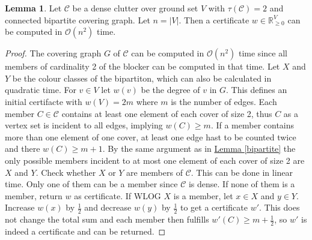 \documentclass[a4paper, 12pt]{scrbook}
\theoremstyle{definition}
\newtheorem{lemma}[theorem]{Lemma}
\newcommand*{\IR}{\ensuremath{\mathbb{R}}}
\begin{document}
   \begin{lemma}\label{computecert}
       Let $\mathcal{C}$ be a dense clutter over ground set $V$ with $\tau(\mathcal{C})=2$ and connected bipartite covering graph. Let $n=|V|$. Then a certificate $w \in \IR^V_{\geq 0}$ can be computed in $\mathcal{O}(n^2)$ time.
   \end{lemma}

   \begin{proof}
       The covering graph $G$ of $\mathcal{C}$ can be computed in $\mathcal{O}(n^2)$ time since all members of cardinality 2 of the blocker can be computed in that time.
       Let $X$ and $Y$ be the colour classes of the bipartiton, which can also be calculated in quadratic time.
       For $v \in V$ let $w(v)$ be the degree of $v$ in $G$. This defines an initial certifacte with $w(V) = 2m$ where $m$ is the number of edges.
       Each member $C \in \mathcal{C}$ contains at least one element of each cover of size 2, thus $C$ as a vertex set is incident to all edges, implying $w(C) \geq m$.
       If a member contains more than one element of one cover, at least one edge hast to be counted twice and there $w(C) \geq m+1$.
       By the same argument as in \hyperref[bipartite]{Lemma \ref*{bipartite}} the only possible members incident to at most one element of each cover of size 2 are $X$ and $Y$.
       Check whether $X$ or $Y$ are members of $\mathcal{C}$. This can be done in linear time.
       Only one of them can be a member since $\mathcal{C}$ is dense.
       If none of them is a member, return $w$ as certificate.
       If WLOG $X$ is a member, let $x \in X$ and $y \in Y$.
       Increase $w(x)$ by $\frac 12$ and decrease $w(y)$ by $\frac 12$ to get a certificate $w'$.
       This does not change the total sum and each member then fulfills $w'(C) \geq m + \frac 12$, so $w'$ is indeed a certificate and can be returned.
   \end{proof}
\end{document}
